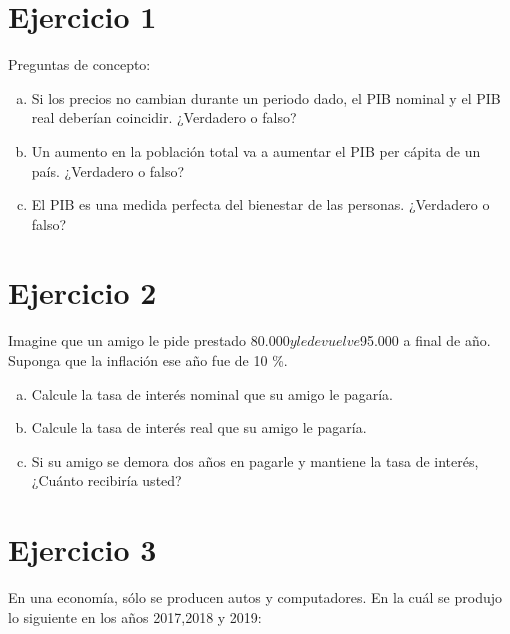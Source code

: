 \documentclass[11pt,letterpaper]{article}
\begin{document}
\newpage

\section*{Ejercicio 1}
\noindent Preguntas de concepto:

\begin{enumerate}[a)]
    \item Si los precios no cambian durante un periodo dado, el PIB nominal y el PIB real deberían coincidir. ¿Verdadero o falso?
    
    \item Un aumento en la población total va a aumentar el PIB per cápita de un país. ¿Verdadero o falso?
    
    \item El PIB es una medida perfecta del bienestar de las personas. ¿Verdadero o falso?
    
\end{enumerate}


\section*{Ejercicio 2}
\noindent Imagine que un amigo le pide prestado $80.000 y le devuelve $95.000 a final de año. Suponga que la
inflación ese año fue de 10 \%.

\begin{enumerate}[a)]

\item Calcule la tasa de interés nominal que su amigo le pagaría.

\item Calcule la tasa de interés real que su amigo le pagaría.

\item  Si su amigo se demora dos años en pagarle y mantiene la tasa de interés, ¿Cuánto recibiría usted?

\end{enumerate}



\section*{Ejercicio 3}
\noindent En una economía, sólo se producen autos y computadores. En la cuál se produjo lo siguiente en los años 2017,2018 y 2019:\\
\end{document}
